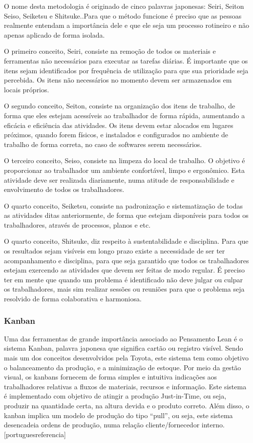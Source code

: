 O nome desta metodologia é originado de cinco palavras japonesas: Seiri, Seiton Seiso, Seiketsu e Shitsuke..Para que o método funcione é preciso que as pessoas realmente entendam a importância dele e que ele seja um processo rotineiro e não apenas aplicado de forma isolada.

O primeiro conceito, Seiri, consiste na  remoção de todos os materiais e ferramentas não necessários para executar as tarefas diárias. É importante que os itens sejam identificados por frequência de utilização para que sua prioridade seja percebida. Os itens não necessários no momento devem ser armazenados em locais próprios. 

O segundo conceito, Seiton, consiste na organização dos itens de trabalho, de forma que eles estejam acessíveis ao trabalhador de forma rápida, aumentando a eficácia e eficiência das atividades. Os itens devem estar alocados em lugares próximos, quando forem físicos, e instalados e configurados no ambiente de trabalho de forma correta, no caso de softwares serem necessários.

O terceiro conceito, Seiso, consiste na limpeza do local de trabalho. O objetivo é proporcionar ao trabalhador um ambiente confortável, limpo e ergonômico. Esta atividade deve ser realizada diariamente, numa atitude de responsabilidade e envolvimento de todos os trabalhadores.

O quarto conceito, Seiketsu, consiste na padronização e sistematização de todas as atividades ditas anteriormente, de forma que estejam disponíveis para todos os trabalhadores, através de processos, planos e etc. 

O quarto conceito, Shitsuke, diz respeito à sustentabilidade e disciplina. Para que os resultados sejam visíveis em longo prazo existe a necessidade de ser ter acompanhamento e disciplina, para que seja garantido que todos os trabalhadores estejam exercendo as atividades que devem ser feitas de modo regular. É preciso ter em mente que quando um problema é identificado não deve julgar ou culpar os trabalhadores, mais sim realizar sessões ou reuniões para que o problema seja resolvido de forma colaborativa e harmoniosa. 

\subsubsection[Kanban]{Kanban}

Uma das ferramentas de grande importância associado ao Pensamento Lean é o sistema Kanban, palavra japonesa que significa cartão ou registro visível. Sendo mais um dos conceitos desenvolvidos pela Toyota, este sistema tem como objetivo o balanceamento da produção, e a minimização de estoque. Por meio da gestão visual, os kanbans fornecem de forma simples e intuitiva indicações aos trabalhadores relativas a fluxos de materiais, recursos e informação.  Este sistema é implementado com objetivo de atingir a produção Just-in-Time, ou seja, produzir na quantidade certa, na altura devida e o produto correto. Além disso, o kanban implica um modelo de produção do tipo “pull”, ou seja, este sistema desencadeia ordens de produção, numa relação cliente/fornecedor interno. [portuguesreferencia] 


